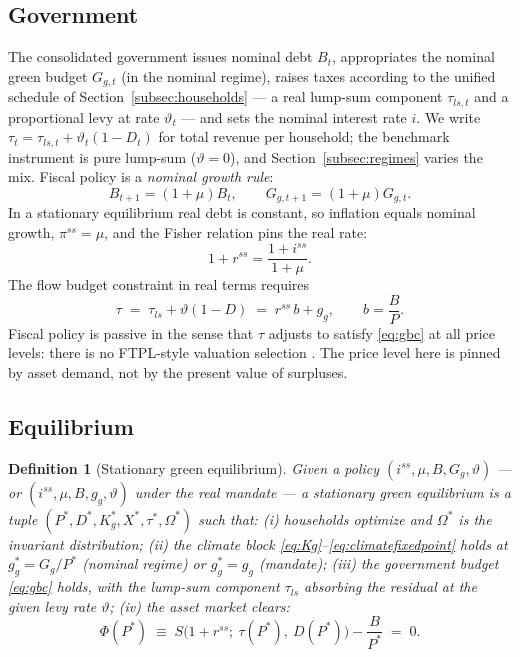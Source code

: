 \documentclass[12pt]{article}
\newtheorem{definition}{Definition}
\newcommand{\Sfun}{S}
\begin{document}
\subsection{Government}\label{subsec:government}

The consolidated government issues nominal debt $B_t$, appropriates the
nominal green budget $G_{g,t}$ (in the nominal regime), raises taxes
according to the unified schedule of Section~\ref{subsec:households} --- a
real lump-sum component $\tau_{ls,t}$ and a proportional levy at rate
$\vartheta_t$ --- and sets the nominal interest rate $i$. We write
$\tau_t = \tau_{ls,t} + \vartheta_t(1-D_t)$ for total revenue per
household; the benchmark instrument is pure lump-sum ($\vartheta=0$), and
Section~\ref{subsec:regimes} varies the mix. Fiscal policy is a
\emph{nominal growth rule}:
\begin{equation}
B_{t+1} = (1+\mu)B_t, \qquad G_{g,t+1} = (1+\mu)G_{g,t}.
\label{eq:nominalrule}
\end{equation}
In a stationary equilibrium real debt is constant, so inflation equals nominal
growth, $\pi^{ss}=\mu$, and the Fisher relation pins the real rate:
\begin{equation}
1+r^{ss} = \frac{1+i^{ss}}{1+\mu}.
\label{eq:fisher}
\end{equation}
The flow budget constraint in real terms requires
\begin{equation}
\tau \;=\; \tau_{ls} + \vartheta(1-D) \;=\; r^{ss}\, b + g_g, \qquad
b = \frac{B}{P}.
\label{eq:gbc}
\end{equation}
Fiscal policy is passive in the sense that $\tau$ adjusts to satisfy
\eqref{eq:gbc} at all price levels: there is no FTPL-style valuation
selection \citep{reis2022,bianchimelosi2017}. The price level here is
pinned by asset demand, not by the present value of surpluses.

\subsection{Equilibrium}\label{subsec:equilibrium}

\begin{definition}[Stationary green equilibrium]\label{def:equilibrium}
Given a policy $(i^{ss},\mu,B,G_g,\vartheta)$ --- or
$(i^{ss},\mu,B,g_g,\vartheta)$ under the real mandate --- a stationary green
equilibrium is a tuple
$(P^{*},D^{*},K_g^{*},X^{*},\tau^{*},\Omega^{*})$ such that:
(i) households optimize and $\Omega^{*}$ is the invariant distribution;
(ii) the climate block \eqref{eq:Kg}--\eqref{eq:climatefixedpoint} holds at
$g_g^{*}=G_g/P^{*}$ (nominal regime) or $g_g^{*}=g_g$ (mandate);
(iii) the government budget \eqref{eq:gbc} holds, with the lump-sum
component $\tau_{ls}$ absorbing the residual at the given levy rate
$\vartheta$;
(iv) the asset market clears:
\begin{equation}
\Phi(P^{*}) \;\equiv\;
\Sfun\big(1+r^{ss};\ \tau(P^{*}),\ D(P^{*})\big) - \frac{B}{P^{*}} \;=\; 0.
\label{eq:assetmarket}
\end{equation}
\end{definition}
\end{document}
